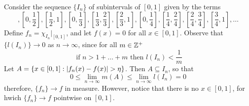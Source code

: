 \begin{example}\label{example_10.7}
    Consider the sequence $\{I_n\}$ of subintervals of $[0,1]$ given by the
    terms
    \begin{equation*}
        [0,1], [0,\frac{1}{2}], [\frac{1}{2},1], [0,\frac{1}{3}],
        [\frac{1}{3},\frac{2}{3}], [\frac{2}{3},1], [0,\frac{1}{4}],
        [\frac{1}{4},\frac{2}{4}], [\frac{2}{4}, \frac{3}{4}], [\frac{3}{4},1],
        \dots
    \end{equation*}
    Define $f_n=\chi_{I_n}|_{[0,1]}$, and let $f(x)=0$ for all $x \in [0,1]$.
    Observe that $\{l(I_n)\} \xrightarrow{} 0$ as $n \xrightarrow{} \infty$,
    since for all $m \in \mathbb{Z}^+$
    \begin{equation*}
        \text{ if } n>1+\dots+m \text{ then } l(I_n)<\frac{1}{m}
    \end{equation*}
    Let $A=\{x \in [0,1] : |f_n(x)-f(x)|>\n\}$. Then $A \subseteq I_n$, so that
    \begin{equation*}
        0 \leq
        \lim_{n \xrightarrow{} \infty}{m(A)} \leq
        \lim_{n \xrightarrow{} \infty}{l(I_n)}=0
    \end{equation*}
    therefore, $\{f_n\} \xrightarrow{} f$ in measure. However, notice that there
    is no $x \in [0,1]$, for hwich $\{f_n\} \xrightarrow{} f$ pointwise on
    $[0,1]$.
\end{example}

